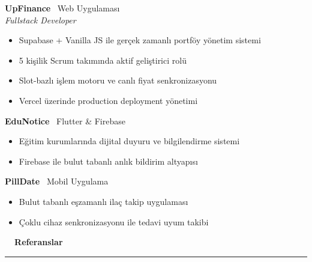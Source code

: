 \documentclass[9pt,a4paper]{article}
\newcommand{\mainsection}[2]{%
    \vspace{1.2ex}%
    {\Large\bfseries\color{accentblue} #1\ \ #2}\par%
    \vspace{0.3ex}%
    {\color{rulecolor}\rule{\linewidth}{1.5pt}}\par%
    \vspace{0.8ex}%
}
\begin{document}
\begin{minipage}[t][\paperheight]{14.1cm}
\begin{minipage}[t]{12.6cm}
        \vspace{0.8ex}

        \textbf{\large \color{maintext} UpFinance} \hfill {\color{lightgray}\faGlobe\ Web Uygulaması} \\
        {\color{accentblue}\textit{Fullstack Developer}}
        \begin{itemize}[leftmargin=1.2em, itemsep=0.1ex, parsep=0pt, topsep=0.3ex, label={\textcolor{accentblue}{\scriptsize\faAngleRight}}]
            \item Supabase + Vanilla JS ile gerçek zamanlı portföy yönetim sistemi
            \item 5 kişilik Scrum takımında aktif geliştirici rolü
            \item Slot-bazlı işlem motoru ve canlı fiyat senkronizasyonu
            \item Vercel üzerinde production deployment yönetimi
        \end{itemize}

        \vspace{0.8ex}

        \textbf{\large \color{maintext} EduNotice} \hfill {\color{lightgray}\faMobile*\ Flutter \& Firebase} \\
        \begin{itemize}[leftmargin=1.2em, itemsep=0.1ex, parsep=0pt, topsep=0.3ex, label={\textcolor{accentblue}{\scriptsize\faAngleRight}}]
            \item Eğitim kurumlarında dijital duyuru ve bilgilendirme sistemi
            \item Firebase ile bulut tabanlı anlık bildirim altyapısı
        \end{itemize}

        \vspace{0.8ex}

        \textbf{\large \color{maintext} PillDate} \hfill {\color{lightgray}\faHeartbeat\ Mobil Uygulama} \\
        \begin{itemize}[leftmargin=1.2em, itemsep=0.1ex, parsep=0pt, topsep=0.3ex, label={\textcolor{accentblue}{\scriptsize\faAngleRight}}]
            \item Bulut tabanlı eşzamanlı ilaç takip uygulaması
            \item Çoklu cihaz senkronizasyonu ile tedavi uyum takibi
        \end{itemize}

        \mainsection{\faUserTie}{Referanslar}


\end{minipage}
\end{minipage}
\end{document}
